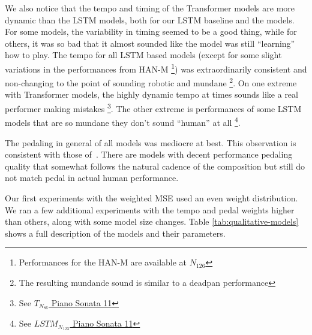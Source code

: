 \newcommand{\lm}[1]{$LSTM_{N_{#1}}$}

We also notice that the tempo and timing of the Transformer models are more dynamic than the LSTM models, both for our LSTM baseline and the \vnet{} models. For some models, the variability in timing seemed to be a good thing, while for others, it was so bad that it almost sounded like the model was still ``learning'' how to play. The tempo for all LSTM based models (except for some slight variations in the performances from HAN-M \footnote{Performances for the HAN-M are available at \href{https://ui.neptune.ai/richt3211/thesis/e/THESIS-162/artifacts}{$N_{126}$}}) was extraordinarily consistent and non-changing to the point of sounding robotic and mundane%
\footnote{The resulting mundande sound is similar to a deadpan performance}. On one extreme with Transformer models, the highly dynamic tempo at times sounds like a real performer making mistakes \footnote{See \href{https://ui.neptune.ai/richt3211/thesis/e/THESIS-86/artifacts}{$T_{N_{86}}$ Piano Sonata 11}}. The other extreme is performances of some LSTM models that are so mundane they don't sound ``human'' at all \footnote{See \href{https://ui.neptune.ai/richt3211/thesis/e/THESIS-123/artifacts}{\lm{123} Piano Sonata 11}}. 

The pedaling in general of all models was mediocre at best. This observation is consistent with those of~\citet{jeong2019virtuosonet}. There are models with decent performance pedaling quality that somewhat follows the natural cadence of the composition but still do not match pedal in actual human performance. %


Our first experiments with the weighted MSE used an even weight distribution. We ran a few additional experiments with the tempo and pedal weights higher than others, along with some model size changes. Table \ref{tab:qualitative-models} shows a full description of the models and their parameters.

